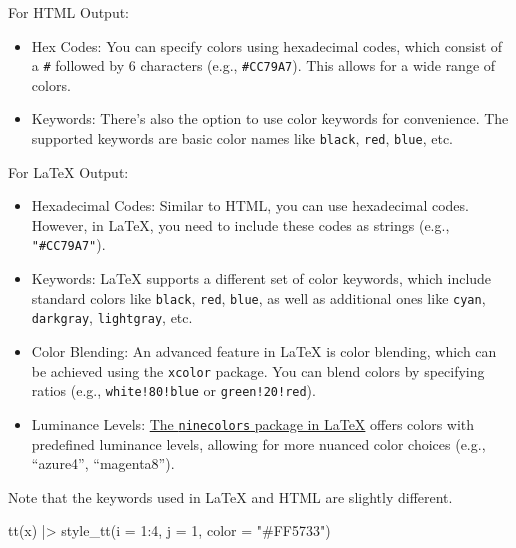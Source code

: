 \documentclass[
  letterpaper,
  DIV=11,
  numbers=noendperiod]{scrartcl}
\newenvironment{Shaded}{\begin{snugshade}}{\end{snugshade}}
\newcommand{\AttributeTok}[1]{\textcolor[rgb]{0.40,0.45,0.13}{#1}}
\newcommand{\DecValTok}[1]{\textcolor[rgb]{0.68,0.00,0.00}{#1}}
\newcommand{\FunctionTok}[1]{\textcolor[rgb]{0.28,0.35,0.67}{#1}}
\newcommand{\NormalTok}[1]{\textcolor[rgb]{0.00,0.23,0.31}{#1}}
\newcommand{\SpecialCharTok}[1]{\textcolor[rgb]{0.37,0.37,0.37}{#1}}
\newcommand{\StringTok}[1]{\textcolor[rgb]{0.13,0.47,0.30}{#1}}
\providecommand{\tightlist}{%
  \setlength{\itemsep}{0pt}\setlength{\parskip}{0pt}}\usepackage{longtable,booktabs,array}
\begin{document}
For HTML Output:

\begin{itemize}
\tightlist
\item
  Hex Codes: You can specify colors using hexadecimal codes, which
  consist of a \texttt{\#} followed by 6 characters (e.g.,
  \texttt{\#CC79A7}). This allows for a wide range of colors.
\item
  Keywords: There's also the option to use color keywords for
  convenience. The supported keywords are basic color names like
  \texttt{black}, \texttt{red}, \texttt{blue}, etc.
\end{itemize}

For LaTeX Output:

\begin{itemize}
\tightlist
\item
  Hexadecimal Codes: Similar to HTML, you can use hexadecimal codes.
  However, in LaTeX, you need to include these codes as strings (e.g.,
  \texttt{"\#CC79A7"}).
\item
  Keywords: LaTeX supports a different set of color keywords, which
  include standard colors like \texttt{black}, \texttt{red},
  \texttt{blue}, as well as additional ones like \texttt{cyan},
  \texttt{darkgray}, \texttt{lightgray}, etc.
\item
  Color Blending: An advanced feature in LaTeX is color blending, which
  can be achieved using the \texttt{xcolor} package. You can blend
  colors by specifying ratios (e.g., \texttt{white!80!blue} or
  \texttt{green!20!red}).
\item
  Luminance Levels: \href{https://ctan.org/pkg/ninecolors?lang=en}{The
  \texttt{ninecolors} package in LaTeX} offers colors with predefined
  luminance levels, allowing for more nuanced color choices (e.g.,
  ``azure4'', ``magenta8'').
\end{itemize}

Note that the keywords used in LaTeX and HTML are slightly different.

\begin{Shaded}
\begin{Highlighting}[]
\FunctionTok{tt}\NormalTok{(x) }\SpecialCharTok{|\textgreater{}} \FunctionTok{style\_tt}\NormalTok{(}\AttributeTok{i =} \DecValTok{1}\SpecialCharTok{:}\DecValTok{4}\NormalTok{, }\AttributeTok{j =} \DecValTok{1}\NormalTok{, }\AttributeTok{color =} \StringTok{"\#FF5733"}\NormalTok{)}
\end{Highlighting}
\end{Shaded}
\end{document}
